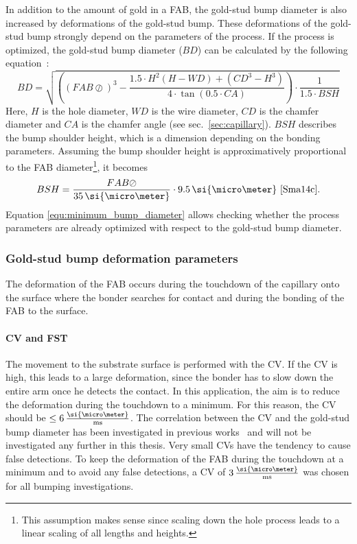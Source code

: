 In addition to the amount of gold in a \ac{FAB}, the gold-stud bump diameter is also increased by deformations of the gold-stud bump. These deformations of the gold-stud bump strongly depend on the parameters of the process. If the process is optimized, the gold-stud bump diameter ($BD$) can be calculated by the following equation~\cite{Sma14c}:
\begin{equation}\label{equ:minimum_bump_diameter}
BD=\sqrt{\left(\left( FAB \oslash \right)^3-\frac{1.5\cdot H^2\left( H-WD\right)+\left( CD^3-H^3\right)}{4\cdot \tan \left( 0.5\cdot CA\right)}\right)\cdot \frac{1}{1.5\cdot BSH}}
\end{equation}
Here, $H$ is the hole diameter, $WD$ is the wire diameter, $CD$ is the chamfer diameter and $CA$ is the chamfer angle (see sec.~\ref{sec:capillary}). $BSH$ describes the bump shoulder height, which is a dimension depending on the bonding parameters. Assuming the bump shoulder height is approximatively proportional to the \ac{FAB} diameter\footnote{This assumption makes sense since scaling down the hole process leads to a linear scaling of all lengths and heights.}, it becomes
\begin{equation}\label{equ:bump_should_height}
BSH=\frac{FAB\oslash}{35\,\si{\micro \meter}}\cdot 9.5\,\si{\micro \meter} \text{ }\cite{Sma14c}.
\end{equation} 
Equation \ref{equ:minimum_bump_diameter} allows checking whether the process parameters are already optimized with respect to the gold-stud bump diameter.


\subsubsection{Gold-stud bump deformation parameters}
The deformation of the \ac{FAB} occurs during the touchdown of the capillary onto the surface where the bonder searches for contact and during the bonding of the \ac{FAB} to the surface.

\paragraph*{\acl{CV} and \acl{FST}}
The movement to the substrate surface is performed with the \acl{CV}. If the \acl{CV} is high, this leads to a large deformation, since the bonder has to slow down the entire arm once he detects the contact. In this application, the aim is to reduce the deformation during the touchdown to a minimum. For this reason, the \acl{CV} should be $\leq 6\,\frac{\si{\micro \meter}}{\rm{ms}}$. The correlation between the \acl{CV} and the gold-stud bump diameter has been investigated in previous works~\cite{Hei12} and will not be investigated any further in this thesis. Very small \acl{CV}s have the tendency to cause false detections. To keep the deformation of the \ac{FAB} during the touchdown at a minimum and to avoid any false detections, a \acl{CV} of $3\,\frac{\si{\micro \meter}}{\rm{ms}}$ was chosen for all bumping investigations.

